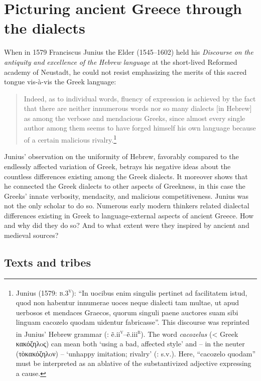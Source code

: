 \chapter{Picturing ancient Greece through the dialects}

When in 1579 Franciscus Junius the Elder (1545–1602) held his \textit{Discourse} \textit{on} \textit{the} \textit{antiquity} \textit{and} \textit{excellence} \textit{of} \textit{the} \textit{Hebrew} \textit{language} at the short-lived Reformed academy of Neustadt, he could not resist emphasizing the merits of this sacred tongue vis-à-vis the Greek language:

\begin{quote}
Indeed, as to individual words, fluency of expression is achieved by the fact that there are neither innumerous words nor so many dialects [in Hebrew] as among the verbose and mendacious Greeks, since almost every single author among them seems to have forged himself his own language because of a certain malicious rivalry.\footnote{Junius (1579: \textsc{b.3}\textsc{\textsuperscript{v}}): “In uocibus enim singulis pertinet ad facilitatem istud, quod non habentur innumerae uoces neque dialecti tam multae, ut apud uerbosos et mendaces Graecos, quorum singuli paene auctores suam sibi linguam cacozelo quodam uidentur fabricasse”. This discourse was reprinted in Junius’ Hebrew grammar (\citealt{Junius1580}: ẽ.ii\textsc{\textsuperscript{v}}–ẽ.iii\textsc{\textsuperscript{r}}). The word \textit{cacozelus} (< Greek κακόζηλoς) can mean both ‘using a bad, affected style’ and – in the neuter (τὸκακόζηλoν) – ‘unhappy imitation; rivalry’ (\citealt{LiddellScott1940}: s.v.). Here, “cacozelo quodam” must be interpreted as an ablative of the substantivized adjective expressing a cause.}
\end{quote}

Junius’ observation on the uniformity of Hebrew, favorably compared to the endlessly affected variation of Greek, betrays his negative ideas about the countless differences existing among the Greek dialects. It moreover shows that he connected the Greek dialects to other aspects of Greekness, in this case the Greeks’ innate verbosity, mendacity, and malicious competitiveness. Junius was not the only scholar to do so. Numerous early modern thinkers related dialectal differences existing in Greek to language-external aspects of ancient Greece. How and why did they do so? And to what extent were they inspired by ancient and medieval sources?

\section{Texts and tribes}

